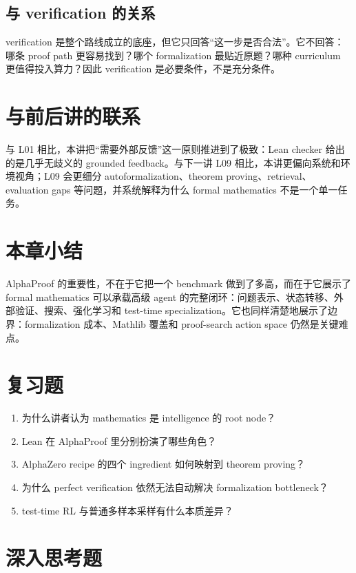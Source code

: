 \subsection{与 verification 的关系}

verification 是整个路线成立的底座，但它只回答“这一步是否合法”。它不回答：哪条 proof path 更容易找到？哪个 formalization 最贴近原题？哪种 curriculum 更值得投入算力？因此 verification 是必要条件，不是充分条件。

\section{与前后讲的联系}

与 L01 相比，本讲把“需要外部反馈”这一原则推进到了极致：Lean checker 给出的是几乎无歧义的 grounded feedback。与下一讲 L09 相比，本讲更偏向系统和环境视角；L09 会更细分 autoformalization、theorem proving、retrieval、evaluation gaps 等问题，并系统解释为什么 formal mathematics 不是一个单一任务。

\section{本章小结}

AlphaProof 的重要性，不在于它把一个 benchmark 做到了多高，而在于它展示了 formal mathematics 可以承载高级 agent 的完整闭环：问题表示、状态转移、外部验证、搜索、强化学习和 test-time specialization。它也同样清楚地展示了边界：formalization 成本、Mathlib 覆盖和 proof-search action space 仍然是关键难点。

\section{复习题}

\begin{enumerate}
\item 为什么讲者认为 mathematics 是 intelligence 的 root node？
\item Lean 在 AlphaProof 里分别扮演了哪些角色？
\item AlphaZero recipe 的四个 ingredient 如何映射到 theorem proving？
\item 为什么 perfect verification 依然无法自动解决 formalization bottleneck？
\item test-time RL 与普通多样本采样有什么本质差异？
\end{enumerate}

\section{深入思考题}

